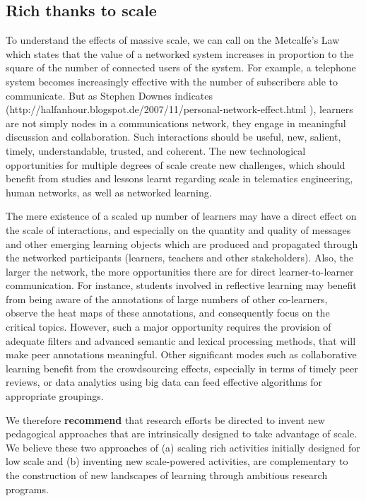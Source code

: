 \subsection{Rich thanks to scale}

To understand the effects of massive scale, we can call on the
Metcalfe’s Law which states that the value of a networked system
increases in proportion to the square of the number of connected users
of the system. For example, a telephone system becomes increasingly
effective with the number of subscribers able to communicate. But as
Stephen Downes indicates
(http://halfanhour.blogspot.de/2007/11/personal-network-effect.html ),
learners are not simply nodes in a communications network, they engage
in meaningful discussion and collaboration. Such interactions should be
useful, new, salient, timely, understandable, trusted, and coherent. The
new technological opportunities for multiple degrees of scale create new
challenges, which should benefit from studies and lessons learnt
regarding scale in telematics engineering, human networks, as well as
networked learning.

The mere existence of a scaled up number of learners may have a direct
effect on the scale of interactions, and especially on the quantity and
quality of messages and other emerging learning objects which are
produced and propagated through the networked participants (learners,
teachers and other stakeholders). Also, the larger the network, the more
opportunities there are for direct learner-to-learner communication. For
instance, students involved in reflective learning may benefit from
being aware of the annotations of large numbers of other co-learners,
observe the heat maps of these annotations, and consequently focus on
the critical topics. However, such a major opportunity requires the
provision of adequate filters and advanced semantic and lexical
processing methods, that will make peer annotations meaningful. Other
significant modes such as collaborative learning benefit from the
crowdsourcing effects, especially in terms of timely peer reviews, or
data analytics using big data can feed effective algorithms for
appropriate groupings.

We therefore \textbf{recommend} that research efforts be directed to invent new
pedagogical approaches that are intrinsically designed to take advantage
of scale. We believe these two approaches of (a) scaling rich activities
initially designed for low scale and (b) inventing new scale-powered
activities, are complementary to the construction of new landscapes of
learning through ambitious research programs.
